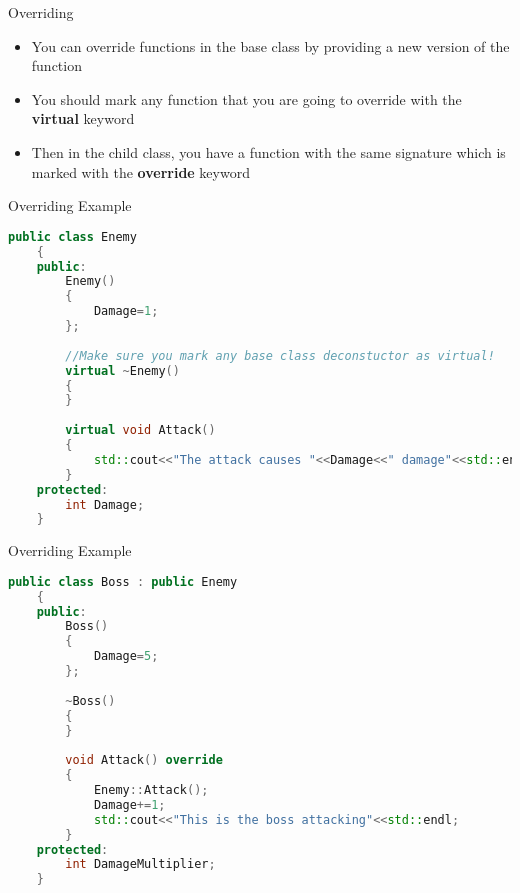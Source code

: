 \begin{frame}{Overriding}
	\begin{itemize}
		\pause \item You can override functions in the base class by providing a new version of the function
		\pause \item You should mark any function that you are going to override with the \textbf{virtual} keyword 
		\pause \item Then in the child class, you have a function with the same signature which is marked with the \textbf{override} keyword
	\end{itemize}
\end{frame}


\begin{frame}[fragile]{Overriding Example}
	\begin{lstlisting}[language=C++,basicstyle=\tiny,]
	public class Enemy
	{
	public:
		Enemy()
		{
			Damage=1;
		};
		
		//Make sure you mark any base class deconstuctor as virtual!
		virtual ~Enemy()
		{
		}
	
		virtual void Attack()
		{
			std::cout<<"The attack causes "<<Damage<<" damage"<<std::endl;
		}
	protected:
		int Damage;
	}
	\end{lstlisting}
\end{frame}

\begin{frame}[fragile]{Overriding Example}
	\begin{lstlisting}[language=C++,basicstyle=\tiny,]
	public class Boss : public Enemy
	{
	public:
		Boss()
		{
			Damage=5;
		};
	
		~Boss()
		{
		}
	
		void Attack() override
		{
			Enemy::Attack();
			Damage+=1;
			std::cout<<"This is the boss attacking"<<std::endl;
		}	
	protected:
		int DamageMultiplier;
	}
	\end{lstlisting}
\end{frame}


